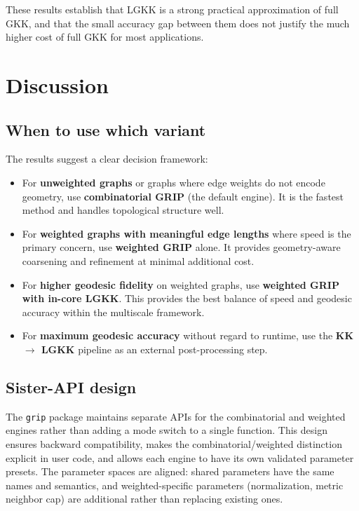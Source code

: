 \documentclass[11pt,twocolumn]{article}
\newcommand{\grip}{\texttt{grip}}
\begin{document}
These results establish that LGKK is a strong practical approximation of
full GKK, and that the small accuracy gap between them does not justify
the much higher cost of full GKK for most applications.


\section{Discussion}\label{sec:discussion}

\subsection{When to use which variant}

The results suggest a clear decision framework:

\begin{itemize}
\item For \textbf{unweighted graphs} or graphs where edge weights do not
  encode geometry, use \textbf{combinatorial GRIP} (the default engine).
  It is the fastest method and handles topological structure well.
\item For \textbf{weighted graphs with meaningful edge lengths} where
  speed is the primary concern, use \textbf{weighted GRIP} alone.  It
  provides geometry-aware coarsening and refinement at minimal additional
  cost.
\item For \textbf{higher geodesic fidelity} on weighted graphs, use
  \textbf{weighted GRIP with in-core LGKK}.  This provides the best
  balance of speed and geodesic accuracy within the multiscale framework.
\item For \textbf{maximum geodesic accuracy} without regard to runtime,
  use the \textbf{KK $\to$ LGKK} pipeline as an external post-processing
  step.
\end{itemize}

\subsection{Sister-API design}

The \grip{} package maintains separate APIs for the combinatorial and
weighted engines rather than adding a mode switch to a single function.
This design ensures backward compatibility, makes the
combinatorial/weighted distinction explicit in user code, and allows each
engine to have its own validated parameter presets.  The parameter spaces
are aligned: shared parameters have the same names and semantics, and
weighted-specific parameters (normalization, metric neighbor cap) are
additional rather than replacing existing ones.
\end{document}
